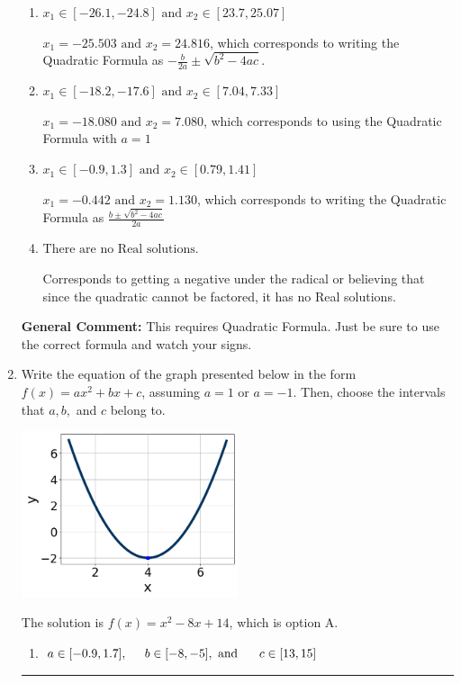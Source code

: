 \documentclass{extbook}[14pt]
\newcommand{\litem}[1]{\item #1

\rule{\textwidth}{0.4pt}}
\begin{document}
\begin{enumerate}
{\begin{enumerate}[label=\Alph*.]
* $x_1 = -1.130 \text{ and } x_2 = 0.442$, which is the correct option.
\item \( x_1 \in [-26.1, -24.8] \text{ and } x_2 \in [23.7, 25.07] \)

 $x_1 = -25.503 \text{ and } x_2 = 24.816$, which corresponds to writing the Quadratic Formula as $-\frac{b}{2a} \pm \sqrt{b^2 - 4ac}$.
\item \( x_1 \in [-18.2, -17.6] \text{ and } x_2 \in [7.04, 7.33] \)

 $x_1 = -18.080 \text{ and } x_2 = 7.080$, which corresponds to using the Quadratic Formula with $a=1$
\item \( x_1 \in [-0.9, 1.3] \text{ and } x_2 \in [0.79, 1.41] \)

 $x_1 = -0.442 \text{ and } x_2 = 1.130$, which corresponds to writing the Quadratic Formula as $\frac{b \pm \sqrt{b^2 - 4ac}}{2a}$
\item \( \text{There are no Real solutions.} \)

Corresponds to getting a negative under the radical or believing that since the quadratic cannot be factored, it has no Real solutions.
\end{enumerate}

\textbf{General Comment:} This requires Quadratic Formula. Just be sure to use the correct formula and watch your signs.
}
\litem{
Write the equation of the graph presented below in the form $f(x)=ax^2+bx+c$, assuming  $a=1$ or $a=-1$. Then, choose the intervals that $a, b,$ and $c$ belong to.

\begin{center}
    \includegraphics[width=0.5\textwidth]{../Figures/quadraticGraphToEquationCopyA.png}
\end{center}


The solution is \( f(x) = x^{2} -8 x + 14 \), which is option A.\begin{enumerate}[label=\Alph*.]
\item \( a \in [-0.9, 1.7], \hspace*{5mm} b \in [-8, -5], \text{ and } \hspace*{5mm} c \in [13, 15] \)


\end{enumerate}}
\end{enumerate}
\end{document}

